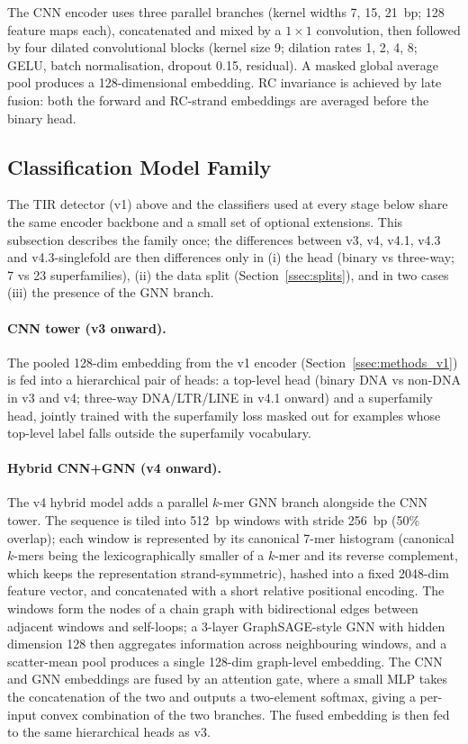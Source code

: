 \documentclass[12pt]{article}
\begin{document}
The CNN encoder uses three parallel branches (kernel widths 7, 15, 21~bp; 128 feature maps each), concatenated and mixed by a $1\!\times\!1$ convolution, then followed by four dilated convolutional blocks (kernel size 9; dilation rates 1, 2, 4, 8; GELU, batch normalisation, dropout 0.15, residual). A masked global average pool produces a 128-dimensional embedding. RC invariance is achieved by late fusion: both the forward and RC-strand embeddings are averaged before the binary head. 

\subsection{Classification Model Family}\label{ssec:methods_family}

The TIR detector (v1) above and the classifiers used at every stage below share the same encoder backbone and a small set of optional extensions. This subsection describes the family once; the differences between v3, v4, v4.1, v4.3 and v4.3-singlefold are then differences only in (i) the head (binary vs three-way; 7 vs 23 superfamilies), (ii) the data split (Section~\ref{ssec:splits}), and in two cases (iii) the presence of the GNN branch.

\paragraph{CNN tower (v3 onward).} The pooled 128-dim embedding from the v1 encoder (Section~\ref{ssec:methods_v1}) is fed into a hierarchical pair of heads: a top-level head (binary DNA vs non-DNA in v3 and v4; three-way DNA/LTR/LINE in v4.1 onward) and a superfamily head, jointly trained with the superfamily loss masked out for examples whose top-level label falls outside the superfamily vocabulary.

\paragraph{Hybrid CNN+GNN (v4 onward).} The v4 hybrid model adds a parallel $k$-mer GNN branch alongside the CNN tower. The sequence is tiled into 512~bp windows with stride 256~bp (50\% overlap); each window is represented by its canonical 7-mer histogram (canonical $k$-mers being the lexicographically smaller of a $k$-mer and its reverse complement, which keeps the representation strand-symmetric), hashed into a fixed 2048-dim feature vector, and concatenated with a short relative positional encoding. The windows form the nodes of a chain graph with bidirectional edges between adjacent windows and self-loops; a 3-layer GraphSAGE-style \cite{hamilton2017inductive} GNN with hidden dimension 128 then aggregates information across neighbouring windows, and a scatter-mean pool produces a single 128-dim graph-level embedding. The CNN and GNN embeddings are fused by an attention gate, where a small MLP takes the concatenation of the two and outputs a two-element softmax, giving a per-input convex combination of the two branches. The fused embedding is then fed to the same hierarchical heads as v3.
\end{document}
